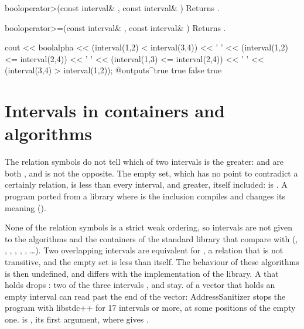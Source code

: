 \documentclass[12pt,a4paper,twoside,openright]{book}
\begin{document}
\begin{deffun}{bool}{operator>}{(const interval\& , const interval\& )}
  Returns .
\end{deffun}

\begin{deffun}{bool}{operator>=}{(const interval\& , const interval\& )}
  Returns .
\begin{example}
cout << boolalpha << (interval(1,2) < interval(3,4)) << ' '
     << (interval(1,2) <= interval(2,4)) << ' '
     << (interval(1,3) <= interval(2,4)) << ' '
     << (interval(3,4) > interval(1,2));
@outputs^true true false true~
\end{example}
\end{deffun}

\section{Intervals in containers and algorithms}\label{sec:lexicographic-less}
%
%
%

The relation symbols do not tell which of two intervals is the greater:
 and 
are both , and  is not the opposite. The empty set,
which has no point to contradict a certainly relation, is less than every
interval, and greater, itself included:  is . A
program ported from a library where  is the inclusion compiles
and changes its meaning ().

\begin{Rem}\label{rem:relations-ordering}
None of the relation symbols is a strict weak ordering, so intervals are not
given to the algorithms and the containers of the standard library that
compare with \code{<} (, , ,
, , ,
\ldots). Two overlapping intervals are equivalent for
\code{<}, a relation that is not transitive, and the empty set is less than
itself. The behaviour of these algorithms is then undefined, and differs with
the implementation of the library. A  that holds
 drops : two of the three intervals ,
 and  stay.  of a vector that holds an
empty interval can read past the end of the vector: AddressSanitizer stops
the program with libstdc++ for 17 intervals or more, at some positions of
the empty one.  is , its
first argument, where  gives .
\end{Rem}
\end{document}
